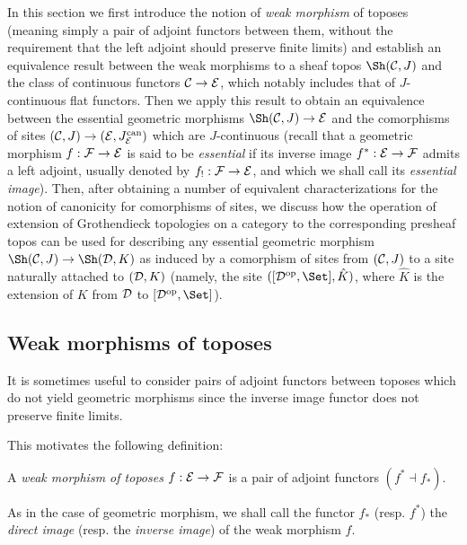 \documentclass[a4paper,12pt]{article}
\begin{document}
In this section we first introduce the notion of \emph{weak morphism} of toposes (meaning simply a pair of adjoint functors between them, without the requirement that the left adjoint should preserve finite limits) and establish an equivalence result between the weak morphisms to a sheaf topos $\Sh({\cal C}, J)$ and the class of continuous functors ${\cal C}\to {\cal E}$, which notably includes that of $J$-continuous flat functors. Then we apply this result to obtain an equivalence between the essential geometric morphisms $\Sh({\cal C}, J)\to {\cal E}$ and the comorphisms of sites $({\cal C}, J)\to ({\cal E}, J^{\textup{can}}_{\cal E})$ which are $J$-continuous (recall that a geometric morphism $f:{\cal F}\to {\cal E}$ is said to be \emph{essential} if its inverse image $f^{\ast}:{\cal E}\to {\cal F}$ admits a left adjoint, usually denoted by $f_{!}:{\cal F}\to {\cal E}$, and which we shall call its \emph{essential image}). Then, after obtaining a number of equivalent characterizations for the notion of canonicity for comorphisms of sites, we discuss how the operation of extension of Grothendieck topologies on a category to the corresponding presheaf topos can be used for describing any essential geometric morphism $\Sh({\cal C}, J)\to \Sh({\cal D}, K)$ as induced by a comorphism of sites from $({\cal C}, J)$ to a site naturally attached to $({\cal D}, K)$ (namely, the site $([{\cal D}^{\textup{op}}, \Set], \hat{K})$, where $\hat{K}$ is the extension of $K$ from $\cal D$ to $[{\cal D}^{\textup{op}}, \Set]$).  


\subsection{Weak morphisms of toposes}\label{sec:weakmorphisms}

It is sometimes useful to consider pairs of adjoint functors between toposes which do not yield geometric morphisms since the inverse image functor does not preserve finite limits. 

This motivates the following definition: 

\begin{definition}
	A \emph{weak morphism of toposes} $f:{\cal E}\to {\cal F}$ is a pair of adjoint functors $(f^{\ast} \dashv f_{\ast})$.
\end{definition}

As in the case of geometric morphism, we shall call the functor $f_{\ast}$ (resp. $f^{\ast}$) the \emph{direct image} (resp. the \emph{inverse image}) of the weak morphism $f$.
\end{document}
